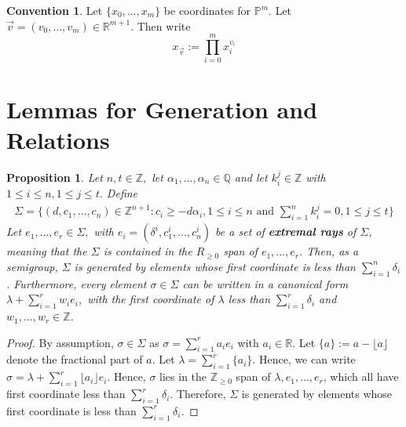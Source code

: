 \documentclass{amsart}
\theoremstyle{plain}
\newtheorem{prop}[thm]{Proposition}
\theoremstyle{definition}
\newtheorem{convention}[thm]{Convention}
\theoremstyle{remark}
\numberwithin{equation}{section}
\newcommand\br{{\mathbb R}}
\newcommand\bq{{\mathbb Q}}
\newcommand\bp{{\mathbb P}}
\newcommand\bz{{\mathbb Z}}
\newcommand\bida{a}
\newcommand\bidb{b}
\newcommand\pdeg{\delta}
\begin{document}
\begin{convention}
Let $\{x_0, \ldots, x_m\}$ be coordinates for $\bp^m$. Let
$\vec{v} = (v_0, \ldots, v_m) \in \br^{m + 1}$. Then write
\[
	x_{\vec{v}} := \prod_{i = 0}^{m} x_i^{v_i}
\]
\end{convention}

\section{Lemmas for Generation and Relations}

\begin{prop}
\label{prop:cone-generation}
Let $n,t \in \bz,$ let $\alpha_1, \ldots, \alpha_n \in \bq$ and let $k_i^j \in \bz$ with $1 \leq i \leq n, 1 \leq j \leq t.$ Define
\begin{align*}
	\Sigma = \{(d, c_1, \ldots, c_n) \in \bz^{n+1} : c_i \geq - d \alpha_i,1 \leq i \leq n \text{ and } \sum_{i=1}^{n}k_i^j = 0, 1 \leq j \leq t\}
\end{align*}
Let $e_1, \ldots, e_r \in \Sigma,$ with $e_i = (\pdeg^i, c_1^i, \ldots, c_n^i)$ be a set of {\bf extremal rays} of $\Sigma$, meaning that the $\Sigma$ is contained in the $R_{\geq 0}$ span of $e_1, \ldots, e_r$.  Then, as a semigroup, $\Sigma$ is generated by elements whose first coordinate is less than $\sum_{i=1}^{n}\pdeg_i$. Furthermore, every element $\sigma \in \Sigma$ can be written in a canonical form $\lambda + \sum_{i=1}^{r} w_i e_i,$ with the first coordinate of $\lambda$ less than $\sum_{i=1}^{r}\pdeg_i$ and $w_1,\ldots, w_r \in \bz$.

\end{prop}

\begin{proof}
\todo{define $\pdeg$, $\bida$, and $\bidb$}
By assumption, $\sigma \in \Sigma$ as $\sigma = \sum_{i=1}^{r} \bida_i e_i$ with $\bida_i \in \br$. Let $\{a\} := a - \lfloor a \rfloor$ denote the fractional part of $a$. Let $\lambda = \sum_{i=1}^{r}\{\bida_i\}$. Hence, we can write $\sigma = \lambda + \sum_{i=1}^{r}\lfloor \bida_i \rfloor e_i.$ Hence, $\sigma$ lies in the $\bz_{\geq 0}$ span of $\lambda, e_1,\ldots, e_r$, which all have first coordinate less than $\sum_{i=1}^{r}\pdeg_i$. Therefore, $\Sigma$ is generated by elements whose first coordinate is less than $\sum_{i=1}^{r}\pdeg_i$.
\end{proof}
\end{document}
